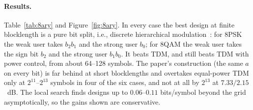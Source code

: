 \documentclass[11pt]{article}
\begin{document}
\paragraph{Results.} Table~\ref{tab:8ary} and Figure~\ref{fig:8ary}. In every case the best design at finite blocklength is a pure bit split, i.e., discrete hierarchical modulation~\cite{jiang2005hierarchical}: for 8PSK the weak user takes $b_2b_1$ and the strong user $b_0$; for 8QAM the weak user takes the sign bit $b_2$ and the strong user $b_1b_0$. It beats TDM, and still beats TDM with power control, from about 64--128 symbols. The paper's construction (the same $a$ on every bit) is far behind at short blocklengths and overtakes equal-power TDM only at $2^{11}$--$2^{13}$ symbols in four of the six cases, and not at all by $2^{13}$ at $7.33/2.15$~dB. The local search finds designs up to $0.06$--$0.11$ bits/symbol beyond the grid asymptotically, so the gains shown are conservative.

\begin{table}[t]
\centering
\caption{Hard-decision 8PSK and 8QAM: largest $R_1$ advantage (bits/symbol, $\varepsilon=10^{-2}$) of the best design over TDM with power control (``pc'') and equal-power TDM (``eq''), and of the paper's construction (same $a$ on every bit) over equal-power TDM.}
\label{tab:8ary}
\end{table}
\end{document}
